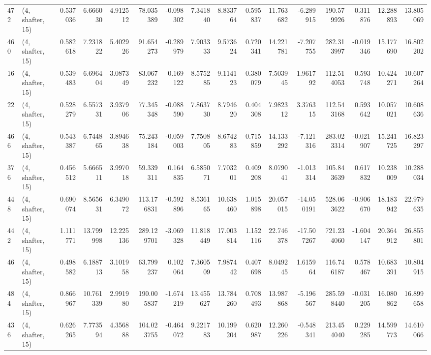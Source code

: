 \begin{tabular}{llrrrrrrrrrrrrrr}
472 &  (4, shafter, 15) &   0.537036 &   6.666030 &   4.912512 &    78.035389 &  -0.098302 &   7.341840 &   8.833764 &  0.595837 &  11.763682 &  -6.289915 &   190.579926 &  0.311876 &  12.288893 &  13.805069 \\
460 &  (4, shafter, 15) &   0.582618 &   7.231822 &   5.402926 &    91.654273 &  -0.289979 &   7.903333 &   9.573624 &  0.720341 &  14.221781 &  -7.207755 &   282.313997 & -0.019346 &  15.177690 &  16.802202 \\
16  &  (4, shafter, 15) &   0.539483 &   6.696404 &   3.087349 &    83.067232 &  -0.169122 &   8.575285 &   9.114123 &  0.380079 &   7.503945 &   1.961792 &   112.514053 &  0.593748 &  10.424271 &  10.607264 \\
22  &  (4, shafter, 15) &   0.528279 &   6.557331 &   3.937906 &    77.345348 &  -0.088590 &   7.863730 &   8.794620 &  0.404308 &   7.982312 &   3.376315 &   112.543168 &  0.593642 &  10.057021 &  10.608636 \\
466 &  (4, shafter, 15) &   0.543387 &   6.744865 &   3.894638 &    75.243184 &  -0.059003 &   7.750805 &   8.674283 &  0.715859 &  14.133292 &  -7.121316 &   283.023314 & -0.021907 &  15.241725 &  16.823297 \\
376 &  (4, shafter, 15) &   0.456512 &   5.666511 &   3.997018 &    59.339311 &   0.164835 &   6.585071 &   7.703201 &  0.409208 &   8.079041 &  -1.013314 &   105.843639 &  0.617832 &  10.238009 &  10.288034 \\
448 &  (4, shafter, 15) &   0.690074 &   8.565631 &   6.349072 &   113.176831 &  -0.592896 &   8.536165 &  10.638460 &  1.015898 &  20.057015 & -14.050191 &   528.063622 & -0.906670 &  18.183942 &  22.979635 \\
442 &  (4, shafter, 15) &   1.111771 &  13.799998 &  12.225136 &   289.129701 &  -3.069328 &  11.818449 &  17.003814 &  1.152116 &  22.746378 & -17.507267 &   721.234060 & -1.604147 &  20.364912 &  26.855801 \\
46  &  (4, shafter, 15) &   0.498582 &   6.188713 &   3.101958 &    63.799237 &   0.102064 &   7.360509 &   7.987442 &  0.407698 &   8.049245 &   1.615964 &   116.746187 &  0.578467 &  10.683391 &  10.804915 \\
484 &  (4, shafter, 15) &   0.866967 &  10.761339 &   2.991980 &   190.005837 &  -1.674219 &  13.455627 &  13.784260 &  0.708493 &  13.987868 &  -5.196567 &   285.598440 & -0.031205 &  16.080862 &  16.899658 \\
436 &  (4, shafter, 15) &   0.626265 &   7.773594 &   4.356888 &   104.023755 &  -0.464072 &   9.221783 &  10.199204 &  0.620987 &  12.260226 &  -0.548341 &   213.454040 &  0.229285 &  14.599773 &  14.610066 \\

\end{tabular}
